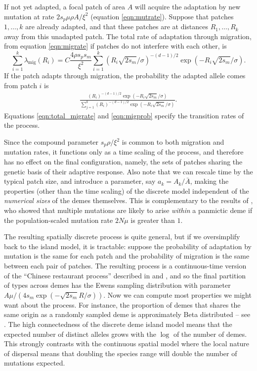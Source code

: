 \documentclass{article}
\newcommand{\citet}[1]{\cite{#1}}
\newcommand{\migrate}{\lambda_\text{mig}}
\begin{document}
If not yet adapted, a focal patch of area $A$ will acquire the adaptation by new mutation at rate $2 s_p \mu \rho A/\xi^2$ (equation \eqref{eqn:mutrate}).
Suppose that patches $1, \ldots, k$ are already adapted,
and that these patches are at distances $R_1, \ldots, R_k$ away from this unadapted patch.
The total rate of adaptation through migration, from equation \eqref{eqn:migrate}
if patches do not interfere with each other, 
is
\begin{equation} \label{eqn:total_migrate}
  \sum_{i=1}^k \migrate(R_i) = C \frac{ 4 \rho s_p s_m }{\xi^2} \sum_{i=1}^{k} \left(R_i \sqrt{2 s_m} /\sigma \right)^{-(d-1)/2} \exp\left(- R_i \sqrt{2 s_m} /\sigma\right).
\end{equation}
If the patch adapts through migration, the probability the adapted allele 
comes from patch $i$ is 
\begin{align}   \label{eqn:migprob}
  \frac{\left(R_i \right)^{-(d-1)/2} \exp\left(- R_i \sqrt{2 s_m}
  /\sigma\right)} {\sum_{j=1}^{k}  \left(R_i \right)^{-(d-1)/2} \exp\left(- R_i \sqrt{2 s_m}
    /\sigma\right) } .
\end{align}
Equations \eqref{eqn:total_migrate} and \eqref{eqn:migprob} specify the transition rates of the process.

Since the compound parameter $s_p \rho / \xi^2$ is common to both migration and mutation rates,
it functions only as a time scaling of the process, 
and therefore has no effect on the final configuration, namely, 
the sets of patches sharing the genetic basis of their adaptive response.
Also note that we can rescale time by the typical patch size, and introduce a parameter, say $a_k = A_k/\bar A$,
making the properties (other than the time scaling) of the discrete model independent of the \emph{numerical sizes} of the demes themselves.
This is complementary to the results of \cite{softsweepsII}, who showed that multiple mutations are likely to arise \emph{within} a panmictic deme
if the population-scaled mutation rate $2 N \mu$ is greater than $1$.

The resulting spatially discrete process is quite general,
but if we oversimplify back to the island model, it is tractable:
suppose the probability of adaptation by mutation is the same for each patch
and the probability of migration is the same between each pair of patches.
The resulting process is a continuous-time version of the ``Chinese restaurant process''
described in \citet{aldous1985exchangeability} and \citet{pitman1995partitions},
and so the final partition of types across demes has the Ewens
sampling distribution with parameter $A \mu / (4 s_m \exp (-\sqrt{2 s_m}R/\sigma))$.
Now we can compute most properties we might want about the process.
For instance, the proportion of demes that shares the same origin as a randomly sampled deme
is approximately Beta distributed -- see \cite{donnelly1989continuity}.
The high connectedness of the discrete deme island model means that the expected number of distinct alleles
grows with the $\log$ of the number of demes.
This strongly contrasts with the continuous spatial model 
where the local nature of dispersal means that doubling the species range will double the number of mutations expected. 
\end{document}
